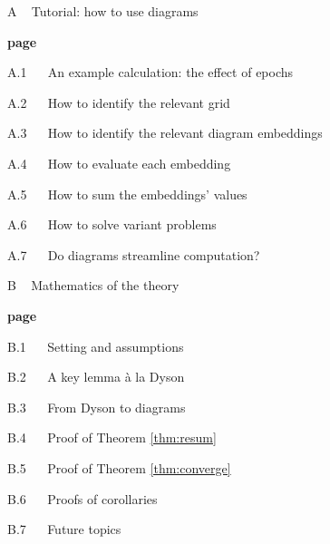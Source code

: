 \documentclass[anon,12pt]{colt2021} %
\begin{document}
{        {\bf
        \par\noindent A ~ Tutorial: how to use diagrams}                        \hfill {\bf page \pageref{appendix:tutorial}}
        \par\indent     A.1 ~~ An example calculation: the effect of epochs     \hfill \pageref{appendix:example}
        \par\indent     A.2 ~~ How to identify the relevant grid                \hfill \pageref{appendix:draw-spacetime} 
        \par\indent     A.3 ~~ How to identify the relevant diagram embeddings  \hfill \pageref{appendix:draw-embeddings}
        \par\indent     A.4 ~~ How to evaluate each embedding                   \hfill \pageref{appendix:evaluate-embeddings}
        \par\indent     A.5 ~~ How to sum the embeddings' values                \hfill \pageref{appendix:sum-embeddings}
        \par\indent     A.6 ~~ How to solve variant problems                    \hfill \pageref{appendix:solve-variants}
        \par\indent     A.7 ~~ Do diagrams streamline computation?              \hfill \pageref{appendix:diagrams-streamline}
    
        {\bf
        \par\noindent B ~ Mathematics of the theory}                            \hfill {\bf page \pageref{appendix:math}}
        \par\indent     B.1 ~~ Setting and assumptions                          \hfill \pageref{appendix:assumptions}
        \par\indent     B.2 ~~ A key lemma \`a la Dyson                         \hfill \pageref{appendix:key-lemma}
        \par\indent     B.3 ~~ From Dyson to diagrams                           \hfill \pageref{appendix:toward-diagrams}
        \par\indent     B.4 ~~ Proof of Theorem \ref{thm:resum}                 \hfill \pageref{appendix:resum}
        \par\indent     B.5 ~~ Proof of Theorem \ref{thm:converge}              \hfill \pageref{appendix:converge}
        \par\indent     B.6 ~~ Proofs of corollaries                            \hfill \pageref{appendix:corollaries}
        \par\indent     B.7 ~~ Future topics                                    \hfill \pageref{appendix:future}
    
}
\end{document}
